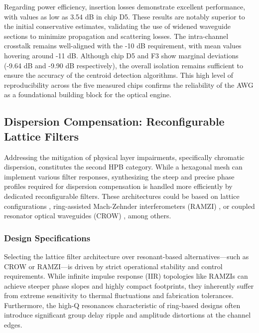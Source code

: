 Regarding power efficiency, insertion losses demonstrate excellent performance, with values as low 
as 3.54 dB in chip D5. These results are notably superior to the initial conservative estimates, 
validating the use of widened waveguide sections to minimize propagation and scattering losses. The 
intra-channel crosstalk remains well-aligned with the -10 dB requirement, with mean values hovering 
around -11 dB. Although chip D5 and F3 show marginal deviations (-9.64 dB and -9.90 dB 
respectively), the overall isolation remains sufficient to ensure the accuracy of the centroid 
detection algorithms. This high level of reproducibility across the five measured chips confirms 
the reliability of the AWG as a foundational building block for the optical engine.


\subsection{Dispersion Compensation: Reconfigurable Lattice Filters}
\label{subsec:lattice_design}

Addressing the mitigation of physical layer impairments, specifically chromatic dispersion, 
constitutes the second HPB category. While a hexagonal mesh can implement various filter responses, 
synthesizing the steep and precise phase profiles required for dispersion compensation is handled 
more efficiently by dedicated reconfigurable filters. These architectures could be based on lattice 
configurations \cite{djordjevicFullyReconfigurableSilicon2011, 
binbinguanCMOSCompatibleReconfigurable2014, ibrahimDemonstrationFastreconfigurableSilicon2011}, 
ring-assisted Mach-Zehnder interferometers (RAMZI) 
\cite{catala-lahozSelfConfiguringProgrammableIntegrated2025}, or coupled resonator optical 
waveguides (CROW) \cite{zhuSiliconPhotonicTunable2025}, among others.

\subsubsection{Design Specifications}

Selecting the lattice filter architecture \cite{takiguchiDispersionSlopeEqualizer1998} over 
resonant-based alternatives—such as CROW or RAMZI—is driven by strict operational stability and 
control requirements. While infinite impulse response (IIR) topologies like RAMZIs can achieve 
steeper phase slopes and highly compact footprints, they inherently suffer from extreme 
sensitivity to thermal fluctuations and fabrication tolerances. Furthermore, the high-Q resonances 
characteristic of ring-based designs often introduce significant group delay ripple and amplitude 
distortions at the channel edges.

